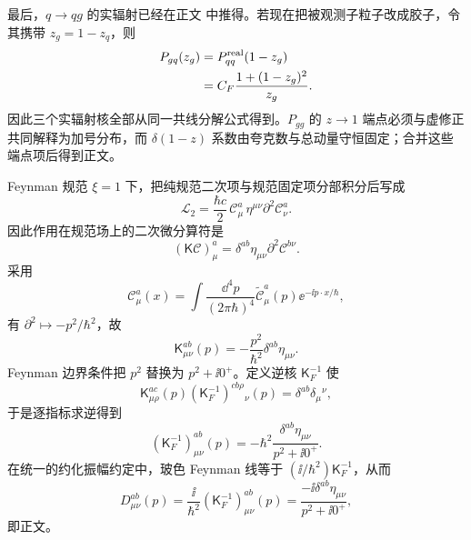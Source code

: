 \begin{derivation}[最低阶部分子分裂核]
最后，$q\to qg$ 的实辐射已经在正文 中推得。若现在把被观测子粒子改成胶子，令其携带 $z_g=1-z_q$，则
\begin{align*}
 P_{gq}(z_g)
 &=P_{qq}^{\rm real}(1-z_g)\\
 &=C_F\frac{1+(1-z_g)^2}{z_g}.
\end{align*}
因此三个实辐射核全部从同一共线分解公式得到。$P_{gg}$ 的 $z\to1$ 端点必须与虚修正共同解释为加号分布，而 $\delta(1-z)$ 系数由夸克数与总动量守恒固定；合并这些端点项后得到正文。
\end{derivation}



\begin{derivation}[三胶子顶角的动量与颜色结构]
Feynman 规范 $\xi=1$ 下，把纯规范二次项与规范固定项分部积分后写成
\begin{equation*}
 \mathcal L_2
 =\frac{\hbar c}{2}\,
 \mathscr C_\mu^a\,\eta^{\mu\nu}\partial^2\mathscr C_\nu^a .
\end{equation*}
因此作用在规范场上的二次微分算符是
\begin{equation*}
 (\mathsf K\mathscr C)_\mu^a
 =\delta^{ab}\eta_{\mu\nu}\partial^2\mathscr C^{b\nu}.
\end{equation*}
采用
\begin{equation*}
 \mathscr C_\mu^a(x)
 =\int\frac{\dd^4p}{(2\pi\hbar)^4}
 \widetilde{\mathscr C}_\mu^a(p)
 \ee^{-\ii p\cdot x/\hbar},
\end{equation*}
有 $\partial^2\mapsto-p^2/\hbar^2$，故
\begin{equation*}
 \mathsf K_{\mu\nu}^{ab}(p)
 =-\frac{p^2}{\hbar^2}\delta^{ab}\eta_{\mu\nu}.
\end{equation*}
Feynman 边界条件把 $p^2$ 替换为 $p^2+\ii0^+$。定义逆核 $\mathsf K_F^{-1}$ 使
\begin{equation*}
 \mathsf K_{\mu\rho}^{ac}(p)
 (\mathsf K_F^{-1})^{cb\rho}{}_{\nu}(p)
 =\delta^{ab}\delta_\mu{}^\nu,
\end{equation*}
于是逐指标求逆得到
\begin{equation*}
 (\mathsf K_F^{-1})_{\mu\nu}^{ab}(p)
 =-\hbar^2\frac{\delta^{ab}\eta_{\mu\nu}}{p^2+\ii0^+}.
\end{equation*}
在统一的约化振幅约定中，玻色 Feynman 线等于 $(\ii/\hbar^2)\mathsf K_F^{-1}$，从而
\begin{equation*}
 D_{\mu\nu}^{ab}(p)
 =\frac{\ii}{\hbar^2}(\mathsf K_F^{-1})_{\mu\nu}^{ab}(p)
 =\frac{-\ii\delta^{ab}\eta_{\mu\nu}}{p^2+\ii0^+},
\end{equation*}
即正文。


\end{derivation}
